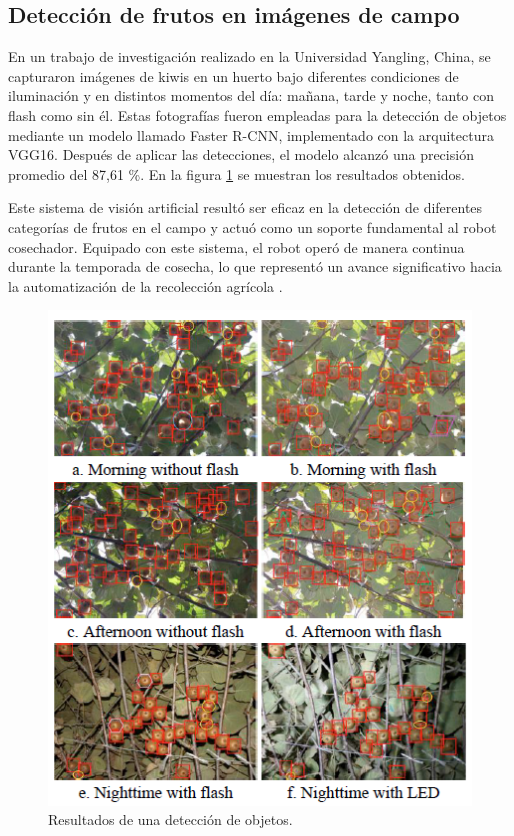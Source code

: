 
\subsection{Detección de frutos en imágenes de campo}

En un trabajo de investigación realizado en la Universidad Yangling, China, se capturaron imágenes de kiwis en un huerto bajo diferentes condiciones de iluminación y en distintos momentos del día: mañana, tarde y noche, tanto con flash como sin él. Estas fotografías fueron empleadas para la detección de objetos mediante un modelo llamado Faster R-CNN, implementado con la arquitectura VGG16. Después de aplicar las detecciones, el modelo alcanzó una precisión promedio del 87,61 \%. En la figura \ref{fig:Song2019} se muestran los resultados obtenidos.

Este sistema de visión artificial resultó ser eficaz en la detección de diferentes categorías de frutos en el campo y actuó como un soporte fundamental al robot cosechador. Equipado con este sistema, el robot operó de manera continua durante la temporada de cosecha, lo que representó un avance significativo hacia la automatización de la recolección agrícola \citep{Song2019}.

\vspace{1cm}

\begin{figure}[htbp]
	\centering
	\includegraphics[width=.5\textwidth]{./Figures/Song2019.png}
	\caption{Resultados de una detección de objetos\protect\footnotemark.}
	\label{fig:Song2019}
\end{figure}

\vspace{1cm}

